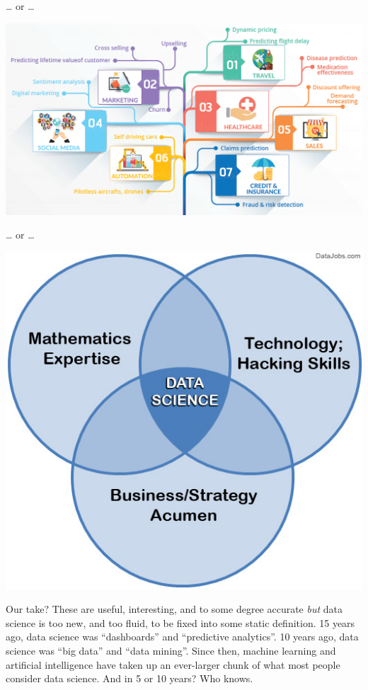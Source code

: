 \documentclass[
]{book}
\begin{document}
\ldots{} or \ldots{}

\includegraphics{img/venn4.png}

\ldots{} or \ldots{}

\includegraphics{img/venn5.jpg}

Our take? These are useful, interesting, and to some degree accurate \emph{but} data science is too new, and too fluid, to be fixed into some static definition. 15 years ago, data science was ``dashboards'' and ``predictive analytics''. 10 years ago, data science was ``big data'' and ``data mining''. Since then, machine learning and artificial intelligence have taken up an ever-larger chunk of what most people consider data science. And in 5 or 10 years? Who knows.
\end{document}
